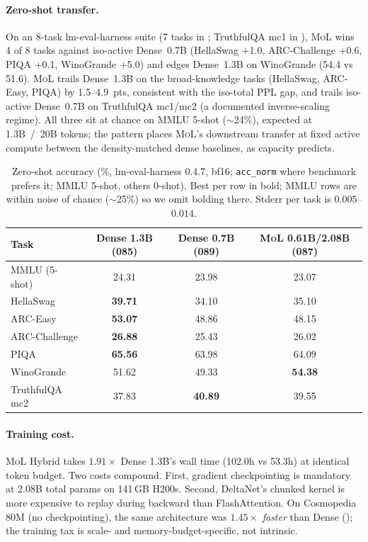 \documentclass[10pt]{article}
\newcommand{\mol}{\textsc{MoL}}
\begin{document}
\paragraph{Zero-shot transfer.} On an 8-task lm-eval-harness suite (7 tasks in ; TruthfulQA mc1 in ), \mol{} wins 4 of 8 tasks against iso-active Dense~0.7B (HellaSwag +1.0, ARC-Challenge +0.6, PIQA +0.1, WinoGrande +5.0) and edges Dense~1.3B on WinoGrande (54.4 vs 51.6). \mol{} trails Dense~1.3B on the broad-knowledge tasks (HellaSwag, ARC-Easy, PIQA) by 1.5--4.9~pts, consistent with the iso-total PPL gap, and trails iso-active Dense~0.7B on TruthfulQA mc1/mc2 (a documented inverse-scaling regime). All three sit at chance on MMLU 5-shot ($\sim$24\%), expected at 1.3B~/~20B tokens; the pattern places \mol{}'s downstream transfer at fixed active compute between the density-matched dense baselines, as capacity predicts.

\begin{table}[h]
\centering\small
\caption{Zero-shot accuracy (\%, lm-eval-harness 0.4.7, bf16; \texttt{acc\_norm} where benchmark prefers it; MMLU 5-shot, others 0-shot). Best per row in bold; MMLU rows are within noise of chance ($\sim$25\%) so we omit bolding there. Stderr per task is $0.005$--$0.014$.}
\label{tab:1p3b_zeroshot}
\begin{tabular}{lccc}
\toprule
Task & Dense 1.3B (085) & Dense 0.7B (089) & \mol{} 0.61B/2.08B (087) \\
\midrule
MMLU (5-shot)    & 24.31 & 23.98 & 23.07 \\
HellaSwag        & \textbf{39.71} & 34.10 & 35.10 \\
ARC-Easy         & \textbf{53.07} & 48.86 & 48.15 \\
ARC-Challenge    & \textbf{26.88} & 25.43 & 26.02 \\
PIQA             & \textbf{65.56} & 63.98 & 64.09 \\
WinoGrande       & 51.62 & 49.33 & \textbf{54.38} \\
TruthfulQA mc2   & 37.83 & \textbf{40.89} & 39.55 \\
\bottomrule
\end{tabular}
\end{table}

\paragraph{Training cost.} \mol{} Hybrid takes $1.91\times$ Dense 1.3B's wall time (102.0h vs 53.3h) at identical token budget. Two costs compound. First, gradient checkpointing is mandatory at 2.08B total params on 141\,GB H200s. Second, DeltaNet's chunked kernel is more expensive to replay during backward than FlashAttention. On Cosmopedia 80M (no checkpointing), the same architecture was $1.45\times$ \emph{faster} than Dense (); the training tax is scale- and memory-budget-specific, not intrinsic.
\end{document}
